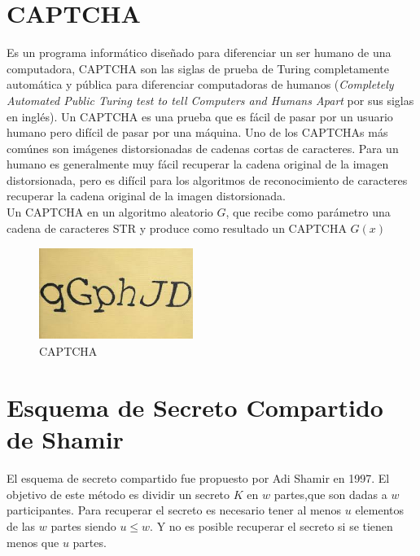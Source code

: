 \section{CAPTCHA}
 Es un programa informático diseñado para diferenciar un ser humano de una computadora, CAPTCHA son las siglas de prueba de Turing completamente automática y pública para diferenciar computadoras de humanos ({\it Completely Automated Public Turing test to tell Computers and Humans Apart} por sus siglas en ingl\'es).  Un CAPTCHA es una prueba que es fácil de pasar por un usuario humano pero difícil de pasar por una máquina. Uno de los CAPTCHAs más com\'unes son imágenes distorsionadas de cadenas cortas de caracteres. Para un humano es generalmente muy fácil recuperar la cadena original de la imagen distorsionada, pero es difícil para  los algoritmos de reconocimiento de caracteres recuperar la cadena original de la imagen distorsionada.\\
Un CAPTCHA en un algoritmo aleatorio $G$, que recibe como parámetro una cadena de caracteres STR y produce como resultado un CAPTCHA $G(x)$\\

\begin{figure}[H]
\centering
	\includegraphics[width=5cm, height=3cm]{./images/cptc.jpeg}
	\caption{CAPTCHA}
	\label{fig:3-6}
\end{figure}
 




\section{Esquema de Secreto Compartido de Shamir}
El esquema de secreto compartido fue propuesto por Adi Shamir en 1997\cite{shamir}. 
El objetivo de este método es dividir un secreto $K$ en $w$ partes,que son dadas a $w$ participantes. Para recuperar el secreto es necesario tener al menos $u$
elementos de las $w$ partes siendo $u \leq w$. Y no es posible recuperar el secreto si se tienen menos que $u$ partes.

